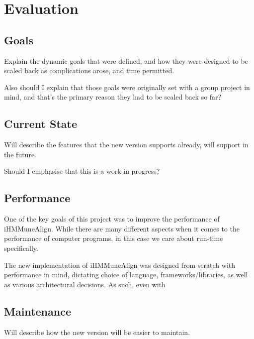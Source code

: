 \chapter{Evaluation}\label{ch:eval}

\section{Goals}
Explain the dynamic goals that were defined, and how they were designed to be scaled back as complications arose, and time permitted. 

Also should I explain that those goals were originally set with a group project in mind, and that's the primary reason they had to be scaled back so far?

\section{Current State}
Will describe the features that the new version supports already, will support in the future.

Should I emphasise that this is a work in progress?

\section{Performance}
One of the key goals of this project was to improve the performance of iHMMuneAlign. While there are many different aspects when it comes to the performance of computer programs, in this case we care about run-time specifically. 

The new implementation of iHMMuneAlign was designed from scratch with performance in mind, dictating choice of language, frameworks/libraries, as well as various architectural decisions. As such, even with 

\section{Maintenance}
Will describe how the new version will be easier to maintain.
